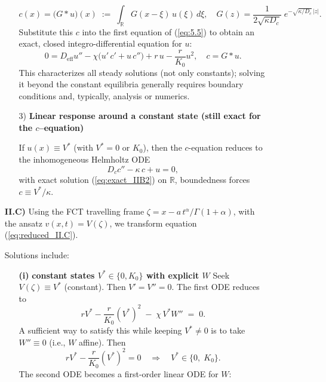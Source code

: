 \documentclass{article}
\begin{document}
\begin{description}
\begin{itemize}
\begin{itemize}
\begin{equation}\label{eq:exact_IIB2}
c(x)=\big(G * u\big)(x)\;:=\;\int_{\mathbb{R}} G(x-\xi)\,u(\xi)\,d\xi,
\quad
G(z)=\frac{1}{2\sqrt{\kappa D_c}}\;e^{-\sqrt{\kappa/D_c}\,|z|}.
\end{equation}
Substitute this $c$ into the first equation of (\ref{eq:5.5}) to obtain an exact, closed integro-differential equation for $u$:
\begin{equation*}
0 = D_{\mathrm{eff}}u'' - \chi\Big(u'\,c' + u\,c''\Big) + r\,u - \frac{r}{K_0}u^2,
\quad c=G*u.
\end{equation*}
This characterizes all steady solutions (not only constants); solving it beyond the constant equilibria generally requires boundary conditions and, typically, analysis or numerics.

\item[3)] \textbf{Linear response around a constant state (still exact for the $c$--equation)}
\par 
If $u(x)\equiv V^*$ (with $V^*=0$ or $K_0$), then the $c$-equation reduces to the inhomogeneous Helmholtz ODE
\begin{equation*}
D_c c'' -\kappa\,c+u=0,
\end{equation*}
 with exact solution (\ref{eq:exact_IIB2}) on $\mathbb{R}$, boundedness forces $c\equiv V^*/\kappa$. 
\end{itemize}
\item[\textbf{II.C)}] Using the FCT travelling frame $\zeta = x - a\,t^{\alpha}/\Gamma(1+\alpha)$, with the ansatz $ v(x,t) = V(\zeta)$, we transform equation (\ref{eq:reduced_II.C}).
\par 
Solutions include:
\begin{itemize}
\item[\textbf{(i)}] \textbf{constant states $V^*\in\{0,K_0\}$ with explicit $W$}
Seek $V(\zeta)\equiv V^*$ (constant). Then $V'=V''=0$. The first ODE reduces to
\begin{equation*}
rV^* - \frac{r}{K_0}(V^*)^2 \;-\; \chi\,V^* W'' \;=\;0.
\end{equation*}
A sufficient way to satisfy this while keeping $V^*\neq0$ is to take $W''\equiv 0$ (i.e., $W$ affine). Then
\begin{equation*}
rV^* - \frac{r}{K_0}(V^*)^2 = 0 \quad\Rightarrow\quad V^*\in\{0,\;K_0\}.
\end{equation*}
The second ODE becomes a first-order linear ODE for $W$:
\begin{equation*}

\end{equation*}
\end{itemize}
\end{itemize}
\end{description}
\end{document}

